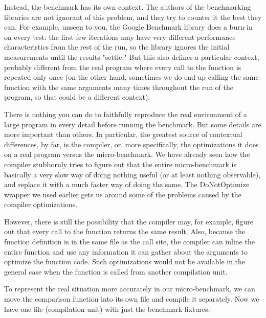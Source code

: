 Instead, the benchmark has its own context. The authors of the benchmarking libraries are not ignorant of this problem, and they try to counter it the best they can. For example, unseen to you, the Google Benchmark library does a burn-in on every test: the first few iterations may have very different performance characteristics from the rest of the run, so the library ignores the initial measurements until the results "settle." But this also defines a particular context, probably different from the real program where every call to the function is repeated only once (on the other hand, sometimes we do end up calling the same function with the same arguments many times throughout the run of the program, so that could be a different context).

There is nothing you can do to faithfully reproduce the real environment of a large program in every detail before running the benchmark. But some details are more important than others. In particular, the greatest source of contextual differences, by far, is the compiler, or, more specifically, the optimizations it does on a real program versus the micro-benchmark. We have already seen how the compiler stubbornly tries to figure out that the entire micro-benchmark is basically a very slow way of doing nothing useful (or at least nothing observable), and replace it with a much faster way of doing the same. The DoNotOptimize wrapper we used earlier gets us around some of the problems caused by the compiler optimizations.

However, there is still the possibility that the compiler may, for example, figure out that every call to the function returns the same result. Also, because the function definition is in the same file as the call site, the compiler can inline the entire function and use any information it can gather about the arguments to optimize the function code. Such optimizations would not be available in the general case when the function is called from another compilation unit. 

To represent the real situation more accurately in our micro-benchmark, we can move the comparison function into its own file and compile it separately. Now we have one file (compilation unit) with just the benchmark fixtures:

